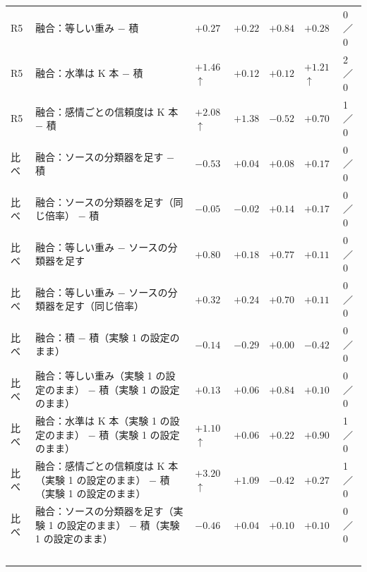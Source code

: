 \begin{longtable}{>{\raggedright}p{0.75cm}>{\raggedright}p{5.6cm}>{\raggedright}p{2.05cm}>{\raggedright}p{2.05cm}>{\raggedright}p{2.05cm}>{\raggedright}p{2.05cm}p{0.75cm}}
R5 & 融合：等しい重み − 積 & $+0.27$\newline{\tiny [$-$0.7, $+$1.2]} & $+0.22$\newline{\tiny [$-$0.4, $+$0.8]} & $+0.84$\newline{\tiny [$+$0.4, $+$1.3]} & $+0.28$\newline{\tiny [$-$0.5, $+$1.0]} & 0／0 \\
R5 & 融合：水準は K 本 − 積 & $+1.46$$\uparrow$\newline{\tiny [$+$0.2, $+$2.8]} & $+0.12$\newline{\tiny [$-$0.6, $+$0.9]} & $+0.12$\newline{\tiny [$-$0.2, $+$0.4]} & $+1.21$$\uparrow$\newline{\tiny [$+$0.3, $+$2.1]} & 2／0 \\
R5 & 融合：感情ごとの信頼度は K 本 − 積 & $+2.08$$\uparrow$\newline{\tiny [$+$0.6, $+$3.6]} & $+1.38$\newline{\tiny [$-$1.2, $+$4.0]} & $-0.52$\newline{\tiny [$-$1.4, $+$0.4]} & $+0.70$\newline{\tiny [$-$0.3, $+$1.7]} & 1／0 \\
比べ & 融合：ソースの分類器を足す − 積 & $-0.53$ & $+0.04$ & $+0.08$ & $+0.17$ & 0／0 \\
比べ & 融合：ソースの分類器を足す（同じ倍率） − 積 & $-0.05$ & $-0.02$ & $+0.14$ & $+0.17$ & 0／0 \\
比べ & 融合：等しい重み − ソースの分類器を足す & $+0.80$ & $+0.18$ & $+0.77$ & $+0.11$ & 0／0 \\
比べ & 融合：等しい重み − ソースの分類器を足す（同じ倍率） & $+0.32$ & $+0.24$ & $+0.70$ & $+0.11$ & 0／0 \\
比べ & 融合：積 − 積（実験 1 の設定のまま） & $-0.14$ & $-0.29$ & $+0.00$ & $-0.42$ & 0／0 \\
比べ & 融合：等しい重み（実験 1 の設定のまま） − 積（実験 1 の設定のまま） & $+0.13$ & $+0.06$ & $+0.84$ & $+0.10$ & 0／0 \\
比べ & 融合：水準は K 本（実験 1 の設定のまま） − 積（実験 1 の設定のまま） & $+1.10$$\uparrow$ & $+0.06$ & $+0.22$ & $+0.90$ & 1／0 \\
比べ & 融合：感情ごとの信頼度は K 本（実験 1 の設定のまま） − 積（実験 1 の設定のまま） & $+3.20$$\uparrow$ & $+1.09$ & $-0.42$ & $+0.27$ & 1／0 \\
比べ & 融合：ソースの分類器を足す（実験 1 の設定のまま） − 積（実験 1 の設定のまま） & $-0.46$ & $+0.04$ & $+0.10$ & $+0.10$ & 0／0 \\
$$
\end{longtable}
